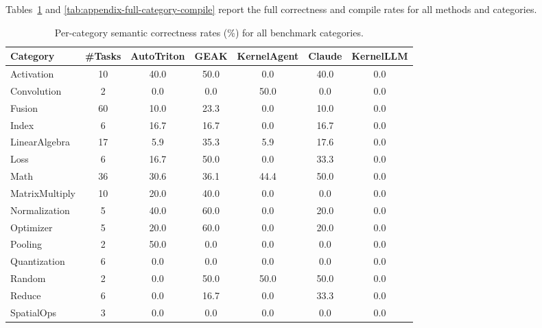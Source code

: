 Tables~\ref{tab:appendix-full-category-correct} and \ref{tab:appendix-full-category-compile} report the full correctness and compile rates for all methods and categories.

\begin{table}[t]
\centering
\small
\setlength{\tabcolsep}{5pt}
\caption{Per-category semantic correctness rates (\%) for all benchmark categories.}
\begin{tabular}{lcccccc}
\toprule
Category & \#Tasks & AutoTriton & GEAK & KernelAgent & Claude & KernelLLM \\
\midrule
Activation     & 10 & 40.0 & 50.0 & 0.0  & 40.0 & 0.0 \\
Convolution    & 2  & 0.0  & 0.0  & 50.0 & 0.0  & 0.0 \\
Fusion         & 60 & 10.0 & 23.3 & 0.0  & 10.0 & 0.0 \\
Index          & 6  & 16.7 & 16.7 & 0.0  & 16.7 & 0.0 \\
LinearAlgebra  & 17 & 5.9  & 35.3 & 5.9  & 17.6 & 0.0 \\
Loss           & 6  & 16.7 & 50.0 & 0.0  & 33.3 & 0.0 \\
Math           & 36 & 30.6 & 36.1 & 44.4 & 50.0 & 0.0 \\
MatrixMultiply & 10 & 20.0 & 40.0 & 0.0  & 0.0  & 0.0 \\
Normalization  & 5  & 40.0 & 60.0 & 0.0  & 20.0 & 0.0 \\
Optimizer      & 5  & 20.0 & 60.0 & 0.0  & 20.0 & 0.0 \\
Pooling        & 2  & 50.0 & 0.0  & 0.0  & 0.0  & 0.0 \\
Quantization   & 6  & 0.0  & 0.0  & 0.0  & 0.0  & 0.0 \\
Random         & 2  & 0.0  & 50.0 & 50.0 & 50.0 & 0.0 \\
Reduce         & 6  & 0.0  & 16.7 & 0.0  & 33.3 & 0.0 \\
SpatialOps     & 3  & 0.0  & 0.0  & 0.0  & 0.0  & 0.0 \\
\bottomrule
\end{tabular}
\label{tab:appendix-full-category-correct}
\end{table}

